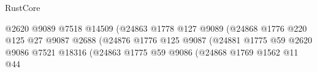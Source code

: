 \begin{lexlean}{RustCore}
\begin{coremodule}
                                                                @2620
                                                                @9089
                                                                @7518
                                                                @14509
                                                                (@24863
                                                                  @1778
                                                                  @127
                                                                  @9089
                                                                  (@24868
                                                                    @1776
                                                                    @220
                                                                    @125
                                                                    @27
                                                                    @9087
                                                                    @2688
                                                                    (@24876
                                                                      @1776
                                                                      @125
                                                                      @9087
                                                                      (@24881
                                                                        @1775
                                                                        @59
                                                                        @2620
                                                                        @9086
                                                                        @7521
                                                                        @18316
                                                                        (@24863
                                                                          @1775
                                                                          @59
                                                                          @9086
                                                                          (@24868
                                                                            @1769
                                                                            @1562
                                                                            @11
                                                                            @44

\end{coremodule}
\end{lexlean}
